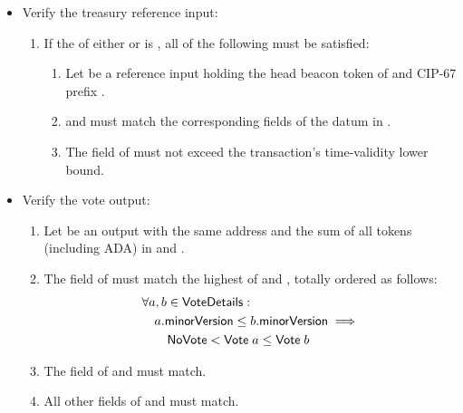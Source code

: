 \documentclass[../hydrozoa.tex]{subfiles}
\begin{document}
\begin{itemize}
\begin{enumerate}
    \end{enumerate}
  \item Verify the treasury reference input:
    \begin{enumerate}[resume]
      \item If the  of either  or  is , all of the following must be satisfied:
        \begin{enumerate}
          \item Let  be a reference input holding the head beacon token of  and CIP-67 prefix \headBeaconToken{}.
          \item {} and  must match the corresponding fields of the  datum in .
          \item The  field of  must not exceed the transaction's time-validity lower bound.
        \end{enumerate}
    \end{enumerate}
  \item Verify the vote output:
    \begin{enumerate}[resume]
      \item Let  be an output with the same address and the sum of all tokens (including ADA) in  and .
      \item The  field of  must match the highest  of  and , totally ordered as follows:
        \begin{equation*}
        \begin{split}
          &\forall a, b \in \mathsf{VoteDetails}:\\
          &\quad a \mathsf{.minorVersion} \leq b \mathsf{.minorVersion} \implies\\
          &\qquad \mathsf{NoVote} < \mathsf{Vote} \; a \leq \mathsf{Vote} \; b  
        \end{split}
        \end{equation*}
      \item The  field of  and  must match.
      \item All other fields of  and  must match.
    \end{enumerate}
\end{itemize}
\end{document}
